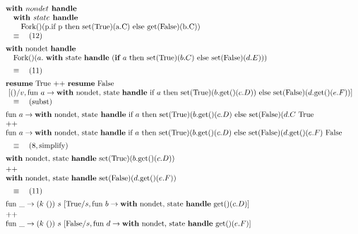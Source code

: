 \documentclass[logo,bsc,singlespacing,parskip]{infthesis}
\begin{document}
\[ 
\begin{array}{l}
\textbf{with } nondet \textbf{ handle} \\
\quad\textbf{with } state \textbf{ handle} \\
\quad\quad \text{Fork()(p.if p then set(True)(a.C) else get(False)(b.C))}
\\
\quad\equiv\quad (12) \\[5pt]
\text{\textbf{with} nondet \textbf{handle}}\ \\ \quad \text{Fork()}(a.\ \text{\textbf{with} state \textbf{handle} } (\textbf{if } a \text{ then set(True)}(b.C) \text{ else set(False)}(d.E))) \\[5pt]
\quad\equiv\quad (11) \\[5pt]
\text{\textbf{resume} True} \text{ ++ } \text{\textbf{resume} False} 
\\ 
\ [()/v, \text{fun } a \rightarrow  \text{\textbf{with} nondet,  state \textbf{handle} if } a \text{ then set(True)}(b.\text{get()}(c.D)) \text{ else set(False)}(d.\text{get()}(e.F))]
\\ \quad\equiv\quad (\text{subst}) \\[5pt]
\text{fun } a \rightarrow \text{\textbf{with} nondet, state} \textbf{ handle} \text{ if } a \text{ then set(True)}(b.\text{get()}(c.D) \text{ else set(False)}(d.C\ \text{True} \\
\text{++} \\
\text{fun } a \rightarrow \text{\textbf{with} nondet, state \textbf{handle} if } a \text{ then set(True)}(b.\text{get()}(c.D) \text{ else set(False)}(d.\text{get()}(e.F)\ \text{False} \\[5pt]
\quad\equiv\quad (8, \text{simplify}) \\[5pt]
\text{\textbf{with} nondet, state \textbf{handle} set(True)}(b.\text{get()}(c.D)) \\[2pt]
\text{++} \\  \text{\textbf{with} nondet, state \textbf{handle} set(False)}(d.\text{get()}(e.F)) \\[5pt]
\quad\equiv\quad (11) \\[5pt]
\text{fun } \_ \rightarrow (k\ ())\ s\ [\text{True}/s, \text{fun } b \rightarrow \text{\textbf{with} nondet, state \textbf{handle} get()}(c.D)] \\[2pt]
 \text{++} \\ \text{fun } \_ \rightarrow (k\ ())\ s\ [\text{False}/s, \text{fun } d \rightarrow \text{\textbf{with} nondet, state \textbf{handle} get()}(e.F)] \\[5pt]

\end{array}\]
\end{document}
